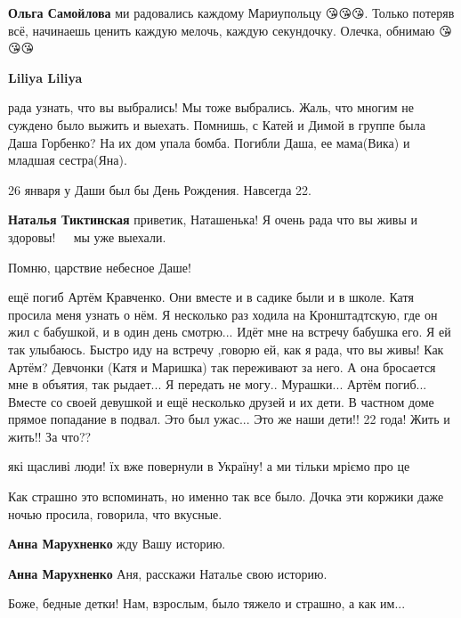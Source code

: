 \begin{itemize} %
\textbf{Ольга Самойлова} ми радовались каждому Мариупольцу 😘😘😘. Только потеряв всё, начинаешь ценить каждую мелочь, каждую секундочку. Олечка, обнимаю 😘😘😘

\textbf{Liliya Liliya} 

рада узнать, что вы выбрались! Мы тоже выбрались. Жаль, что многим не суждено
было выжить и выехать. Помнишь, с Катей и Димой в группе была Даша Горбенко? На
их дом упала бомба. Погибли Даша, ее мама(Вика) и младшая сестра(Яна).

26 января у Даши был бы День Рождения. Навсегда 22.

\textbf{Наталья Тиктинская} приветик, Наташенька! Я очень рада что вы живы и здоровы! 🙏🙏🙏🙏мы уже выехали.

Помню, царствие небесное Даше!🙏🙏🙏🙏

ещё погиб Артём Кравченко. Они вместе и в садике были и в школе. Катя просила
меня узнать о нём. Я несколько раз ходила на Кронштадтскую, где он жил с
бабушкой, и в один день смотрю... Идёт мне на встречу бабушка его. Я ей так
улыбаюсь. Быстро иду на встречу ,говорю ей, как я рада, что вы живы! Как Артём?
Девчонки (Катя и Маришка) так переживают за него. А она бросается мне в
объятия, так рыдает... Я передать не могу.. Мурашки... Артём погиб... Вместе со
своей девушкой и ещё несколько друзей и их дети. В частном доме прямое
попадание в подвал. Это был ужас... Это же наши дети!! 22 года! Жить и жить!!
За что??

\end{itemize} %


які щасливі люди! їх вже повернули в Україну! а ми тільки мріємо про це


Как страшно это вспоминать, но именно так все было. Дочка эти коржики даже
ночью просила, говорила, что вкусные.

\begin{itemize} %
\textbf{Анна Марухненко} жду Вашу историю. 💛

\textbf{Анна Марухненко} Аня, расскажи Наталье свою историю.
\end{itemize} %


Боже, бедные детки! Нам, взрослым, было тяжело и страшно, а как им...

